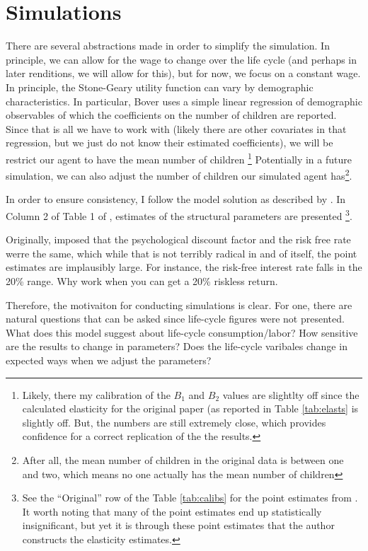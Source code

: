 \documentclass[ProjectMMD]{subfiles}
\begin{document}
\section{Simulations}
There are several abstractions made in order to simplify the simulation. In principle, we can allow for the wage to change over the life cycle (and perhaps in later renditions, we will allow for this), but for now, we focus on a constant wage. In principle, the Stone-Geary utility function can vary by demographic characteristics. In particular, Bover uses a simple linear regression of demographic observables of which the coefficients on the number of children are reported. Since that is all we have to work with (likely there are other covariates in that regression, but we just do not know their estimated coefficients), we will be restrict our agent to have the mean number of children \footnote{Likely, there my calibration of the $B_1$ and $B_2$ values are slightlty off since the calculated elasticity for the original paper (as reported in Table \ref{tab:elasts} is slightly off. But, the numbers are still extremely close, which provides confidence for a correct replication of the the \cite{bover1991relaxing} results.} Potentially in a future simulation, we can also adjust the number of children our simulated agent has\footnote{After all, the mean number of children in the original data is between one and two, which means no one actually has the mean number of children}.   

In order to ensure consistency, I follow the model solution as described by \cite{bover1991relaxing}. In Column 2 of Table 1 of \cite{bover1991relaxing}, estimates of the structural parameters are presented \footnote{See the ``Original'' row of the Table \ref{tab:calibs} for the point estimates from \cite{bover1991relaxing}. It worth noting that many of the point estimates end up statistically insignificant, but yet it is through these point estimates that the author constructs the elasticity estimates. }.

Originally, \cite{bover1991relaxing} imposed that the psychological discount factor and the risk free rate werre the same, which while that is not terribly radical in and of itself, the point estimates are implausibly large. For instance, the risk-free interest rate falls in the 20\% range. Why work when you can get a 20\% riskless return.

Therefore, the motivaiton for conducting simulations is clear. For one, there are natural questions that can be asked since life-cycle figures were not presented. What does this model suggest about life-cycle consumption/labor? How sensitive are the results to change in parameters? Does the life-cycle varibales change in expected ways when we adjust the parameters?
\end{document}
